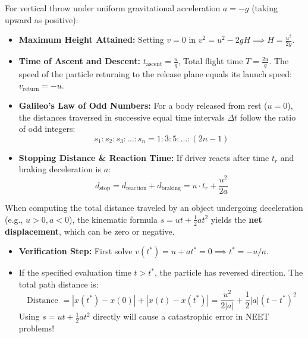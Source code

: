 \documentclass[10pt,twoside,openright]{book}
\begin{document}
\begin{usecasebox}
For vertical throw under uniform gravitational acceleration $a = -g$ (taking upward as positive):
\begin{itemize}
  \item \textbf{Maximum Height Attained:} Setting $v = 0$ in $v^2 = u^2 - 2gH \implies H = \frac{u^2}{2g}$.
  \item \textbf{Time of Ascent and Descent:} $t_{\text{ascent}} = \frac{u}{g}$, Total flight time $T = \frac{2u}{g}$. The speed of the particle returning to the release plane equals its launch speed: $v_{\text{return}} = -u$.
  \item \textbf{Galileo's Law of Odd Numbers:} For a body released from rest ($u=0$), the distances traversed in successive equal time intervals $\Delta t$ follow the ratio of odd integers:
  \begin{equation}
    s_1 : s_2 : s_3 : \dots : s_n = 1 : 3 : 5 : \dots : (2n - 1)
  \end{equation}
  \item \textbf{Stopping Distance \& Reaction Time:} If driver reacts after time $t_r$ and braking deceleration is $a$:
  \begin{equation}
    d_{\text{stop}} = d_{\text{reaction}} + d_{\text{braking}} = u \cdot t_r + \frac{u^2}{2a}
  \end{equation}
\end{itemize}
\end{usecasebox}

\begin{trapbox}
When computing the total distance traveled by an object undergoing deceleration (e.g., $u > 0, a < 0$), the kinematic formula $s = ut + \frac{1}{2}at^2$ yields the \textbf{net displacement}, which can be zero or negative.
\begin{itemize}
  \item \textbf{Verification Step:} First solve $v(t^*) = u + at^* = 0 \implies t^* = -u/a$.
  \item If the specified evaluation time $t > t^*$, the particle has reversed direction. The total path distance is:
  \begin{equation}
    \text{Distance } = |x(t^*) - x(0)| + |x(t) - x(t^*)| = \frac{u^2}{2|a|} + \frac{1}{2}|a|(t - t^*)^2
  \end{equation}
  Using $s = ut + \frac{1}{2}at^2$ directly will cause a catastrophic error in NEET problems!
\end{itemize}
\end{trapbox}
\end{document}
